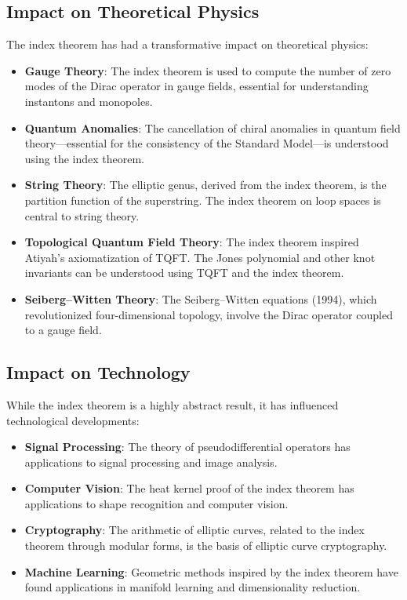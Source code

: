 \subsection{Impact on Theoretical Physics}

The index theorem has had a transformative impact on theoretical physics:
\begin{itemize}
\item \textbf{Gauge Theory}: The index theorem is used to compute the number of zero modes of the Dirac operator in gauge fields, essential for understanding instantons and monopoles.

\item \textbf{Quantum Anomalies}: The cancellation of chiral anomalies in quantum field theory---essential for the consistency of the Standard Model---is understood using the index theorem.

\item \textbf{String Theory}: The elliptic genus, derived from the index theorem, is the partition function of the superstring. The index theorem on loop spaces is central to string theory.

\item \textbf{Topological Quantum Field Theory}: The index theorem inspired Atiyah's axiomatization of TQFT. The Jones polynomial and other knot invariants can be understood using TQFT and the index theorem.

\item \textbf{Seiberg--Witten Theory}: The Seiberg--Witten equations (1994), which revolutionized four-dimensional topology, involve the Dirac operator coupled to a gauge field.
\end{itemize}

\subsection{Impact on Technology}

While the index theorem is a highly abstract result, it has influenced technological developments:
\begin{itemize}
\item \textbf{Signal Processing}: The theory of pseudodifferential operators has applications to signal processing and image analysis.
\item \textbf{Computer Vision}: The heat kernel proof of the index theorem has applications to shape recognition and computer vision.
\item \textbf{Cryptography}: The arithmetic of elliptic curves, related to the index theorem through modular forms, is the basis of elliptic curve cryptography.
\item \textbf{Machine Learning}: Geometric methods inspired by the index theorem have found applications in manifold learning and dimensionality reduction.
\end{itemize}

